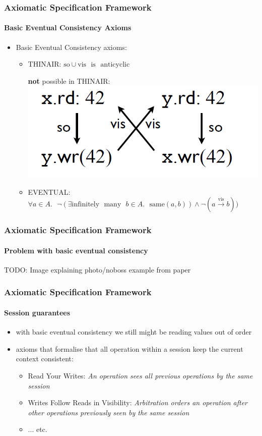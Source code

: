 \documentclass[11pt]{beamer}
\begin{document}
\begin{frame}
\frametitle{Axiomatic Specification Framework}
\framesubtitle{Basic Eventual Consistency Axioms}
\begin{itemize}
\item Basic Eventual Consistency axioms:
\begin{itemize}
\item THINAIR: \(\mathrm{so} \cup \mathrm{vis} \text{ } \mathrm{is} \text{ } \mathrm{anticyclic} \) 
\pause
\begin{center}
\textbf{not} possible in THINAIR:\\
\includegraphics[scale=0.25]{thinair.png}
\end{center}
\pause
\item EVENTUAL: \linebreak \(\forall a \in A. \text{ } \neg(\exists \mathrm{infinitely} \text{ } \mathrm{many} \text{ } b  \in A. \text{ } \mathrm{same}(a,b)) \wedge \neg(a \xrightarrow[]{\text{vis}} b)) \)
\end{itemize}
\end{itemize}
\end{frame}

\begin{frame}
\frametitle{Axiomatic Specification Framework}
\framesubtitle{Problem with basic eventual consistency}
TODO: Image explaining photo/noboss example from paper
\end{frame}

\begin{frame}
\frametitle{Axiomatic Specification Framework}
\framesubtitle{Session guarantees}
\begin{itemize}
\item with basic eventual consistency we still might be reading values out of order
\item axioms that formalise that all operation within a session keep the current context consistent:
\begin{itemize}
\item Read Your Writes: \textit{An operation sees all previous operations
by the same session}
\item Writes Follow Reads in Visibility: \textit{Arbitration orders an
operation after other operations previously seen by the same session}
\item ... etc.
\end{itemize}
\end{itemize}
\end{frame}
\end{document}
